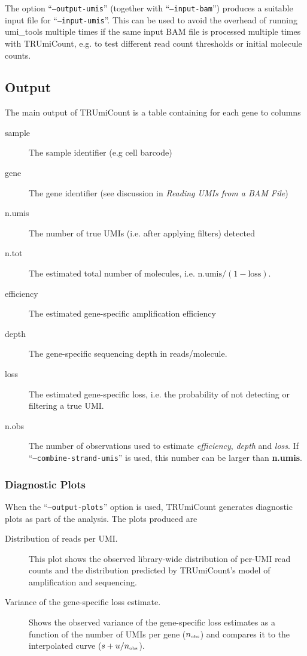 \documentclass[10pt]{article}
\begin{document}
The option ``\texttt{--output-umis}'' (together with ``\texttt{--input-bam}'') produces a suitable input file for ``\texttt{--input-umis}''. This can be used to avoid the overhead of running umi\_tools multiple times if the same input BAM file is processed multiple times with TRUmiCount, e.g. to test different read count thresholds or initial molecule counts.

\subsection{Output}

The main output of TRUmiCount is a table containing for each gene to columns
\begin{description}
\item[sample] The sample identifier (e.g cell barcode)
\item[gene] The gene identifier (see discussion in \textit{Reading UMIs from a BAM File})
\item[n.umis] The number of true UMIs (i.e. after applying filters) detected
\item[n.tot] The estimated total number of molecules, i.e. $\textrm{n.umis} / (1 - \textrm{loss})$.
\item[efficiency] The estimated gene-specific amplification efficiency
\item[depth] The gene-specific sequencing depth in reads/molecule.
\item[loss] The estimated gene-specific loss, i.e. the probability of not detecting or filtering a true UMI. 
\item[n.obs] The number of observations used to estimate \textit{efficiency}, \textit{depth} and \textit{loss}. If ``\texttt{--combine-strand-umis}'' is used, this number can be larger than \textbf{n.umis}.
\end{description}

\subsubsection*{Diagnostic Plots}

When the ``\texttt{--output-plots}'' option is used, TRUmiCount generates diagnostic plots as part of the analysis. The plots produced are

\begin{description}
\item[Distribution of reads per UMI.] This plot shows the observed library-wide distribution of per-UMI read counts and the distribution predicted by TRUmiCount's model of amplification and sequencing.

\item[Variance of the gene-specific loss estimate.] Shows the observed variance of the gene-specific loss estimates as a function of the number of UMIs per gene ($n_{\textrm{\tiny obs}}$) and compares it to the interpolated curve ($s + u / n_{\textrm{\tiny obs}}$).
\end{description}
\end{document}
